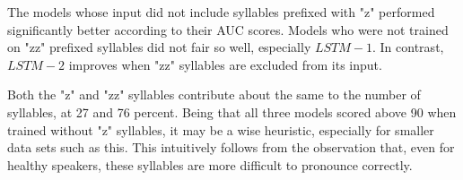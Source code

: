The models whose input did not include syllables prefixed with "z" performed significantly better according to their AUC scores. Models who were not trained on "zz" prefixed syllables did not fair so well, especially $LSTM-1$. In contrast, $LSTM-2$ improves when "zz" syllables are excluded from its input. 

Both the "z" and "zz" syllables contribute about the same to the number of syllables, at 27 and 76 percent. Being that all three models scored above 90 when trained without "z" syllables, it may be a wise heuristic, especially for smaller data sets such as this. This intuitively follows from the observation that, even for healthy speakers, these syllables are more difficult to pronounce correctly.

